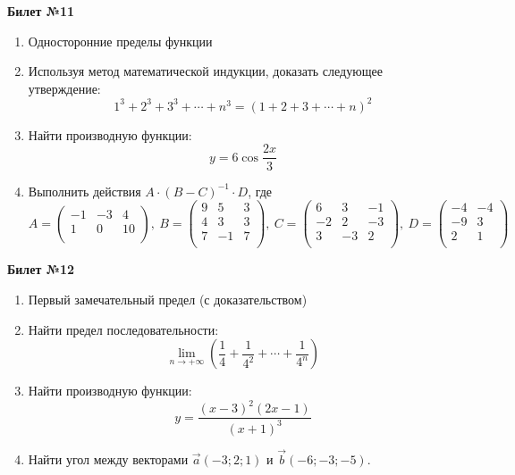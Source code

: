 \documentclass[a4paper, 12pt]{article}
\begin{document}
\begin{center}
    \textbf{Билет №11}
\end{center}
\begin{enumerate}
\item Односторонние пределы функции
\item Используя метод математической индукции, доказать следующее утверждение:
\[1^3 + 2^3 + 3^3 + \cdots + n^3 = (1 + 2 + 3 + \cdots + n)^2\]
\item Найти производную функции: 
\[y =  6 \cos \frac{2x}{3}\]
\item Выполнить действия \(A \cdot (B - C)^{-1}\cdot D\), где
\[
		A = \begin{pmatrix}
			-1 & -3 & 4 \\
			1 & 0 & 10 \\
		\end{pmatrix}, \ 
		B = \begin{pmatrix}
			9 & 5 & 3 \\
			4 & 3 & 3 \\
			7 & -1 & 7 \\
		\end{pmatrix}, \ 
		C = \begin{pmatrix}
			6 & 3 & -1 \\
			-2 & 2 & -3 \\
			3 & -3 & 2 \\
		\end{pmatrix}, \ 
		D = \begin{pmatrix}
			-4 & -4 \\
			-9 & 3 \\
			2 & 1 \\
		\end{pmatrix}
	\]
\end{enumerate}

\begin{center}
    \textbf{Билет №12}
\end{center}
\begin{enumerate}
\item Первый замечательный предел (с доказательством)
\item Найти предел последовательности:  
\[\lim \limits_{n \to +\infty} \left ( \frac{1}{4} + \frac{1}{4^2} + \cdots + \frac{1}{4^n} \right )\]
\item Найти производную функции: 
\[y = \frac{(x - 3)^2(2x - 1)}{(x + 1)^3}\]
\item Найти угол между векторами $\overrightarrow{a}(-3; 2; 1)$ и $\overrightarrow{b}(-6; -3; -5)$.
\end{enumerate}
\end{document}

